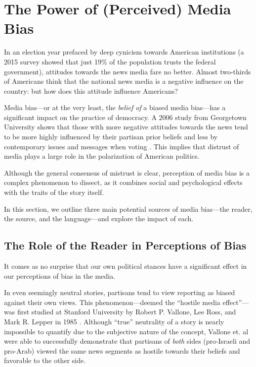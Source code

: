 \chapter{The Power of (Perceived) Media Bias}

In an election year prefaced by deep cynicism towards American institutions (a 2015 survey showed that just 19\% of the population trusts the federal government), attitudes towards the news media fare no better. Almost two-thirds of Americans think that the national news media is a negative influence on the country: but how does this attitude influence Americans? \cite{beyond-distrust}

Media bias---or at the very least, the \emph{belief of} a biased media bias---has a significant impact on the practice of democracy. A 2006 study from Georgetown University shows that those with more negative attitudes towards the news tend to be more highly influenced by their partisan prior beliefs and less by contemporary issues and messages when voting \cite{ladd2005attitudes}. This implies that distrust of media plays a large role in the polarization of American politics.
 
Although the general consensus of mistrust is clear, perception of media bias is a complex phenomenon to dissect, as it combines social and psychological effects with the traits of the story itself.

In this section, we outline three main potential sources of media bias---the reader, the source, and the language---and explore the impact of each.

\section{The Role of the Reader in Perceptions of Bias}

It comes as no surprise that our own political stances have a significant effect in our perceptions of bias in the media. 

In even seemingly neutral stories, partisans tend to view reporting as biased against their own views. This phenomenon---deemed the ``hostile media effect''---was first studied at Stanford University by Robert P. Vallone, Lee Ross, and Mark R. Lepper in 1985 \cite{vallone1985hostile}. Although ``true'' neutrality of a story is nearly impossible to quantify due to the subjective nature of the concept, Vallone et. al were able to successfully demonstrate that partisans of \emph{both} sides (pro-Israeli and pro-Arab) viewed the same news segments as hostile towards their beliefs and favorable to the other side.

